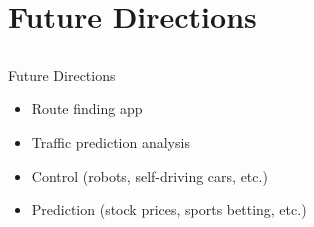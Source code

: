\section{Future Directions}
\subsection{}
\begin{frame}[c]{Future Directions}\centering
\begin{itemize}
\item Route finding app
\item Traffic prediction analysis
\item Control (robots, self-driving cars, etc.)
\item Prediction (stock prices, sports betting, etc.)
\end{itemize}
\end{frame}

